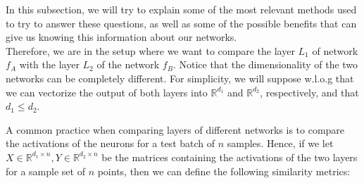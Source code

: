 \documentclass[../main.tex]{subfiles}
\begin{document}
In this subsection, we will try to explain some of the most relevant methods used to try to answer these questions, as well as some of the possible benefits that can give us knowing this information about our networks.\\

Therefore, we are in the setup where we want to compare the layer $L_1$ of network $f_A$ with the layer $L_2$ of the network $f_B$. Notice that the dimensionality of the two networks can be completely different. For simplicity, we will suppose w.l.o.g that we can vectorize the output of both layers into $\mathbb{R}^{d_1}$ and $\mathbb{R}^{d_2}$, respectively, and that $d_1 \leq d_2$.

A common practice when comparing layers of different networks is to compare the activations of the neurons for a test batch of $n$ samples. Hence, if we let $X\in \mathbb{R}^{d_1 \times n}, Y \in \mathbb{R}^{d_2 \times n}$ be the matrices containing the activations of the two layers for a sample set of $n$ points, then we can define the following similarity metrics:
\end{document}
